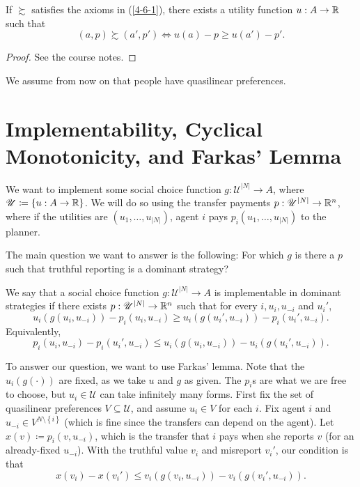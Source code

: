 \begin{proposition}
	If $\succsim$ satisfies the axioms in (\ref{4-6-1}), there exists a utility function $u: A \to \mathbb{R}$ such that \[
		(a,p) \succsim (a',p') \iff u(a) - p \ge u(a') - p'
	.\] 
\end{proposition}
\begin{proof}
	See the course notes.
\end{proof}

We assume from now on that people have quasilinear preferences.

\section{Implementability, Cyclical Monotonicity, and Farkas' Lemma}

We want to implement some social choice function $g: \mathscr{U}^{|N|} \to A$, where $\mathscr{U} \coloneqq \left\{u: A \to \mathbb{R}\right\}$. We will do so using the transfer payments $p: \mathscr{U}^{|N|} \to \mathbb{R}^n$, where if the utilities are $\left( u_1,\ldots,u_{\left| N \right|} \right)$, agent $i$ pays $p_i\left( u_1,\ldots,u_{\left|  N\right|} \right)$ to the planner.

The main question we want to answer is the following: For which $g$ is there a $p$ such that truthful reporting is a dominant strategy?

\begin{definition}[Implementability]
	We say that a social choice function $g: \mathscr{U}^{\left| N \right|} \to A$ is implementable in dominant strategies if there exists $p: \mathscr{U}^{\left| N \right|} \to \mathbb{R}^n$ such that for every $i, u_i, u_{-i}$ and $u_i'$, \[
		u_i\left( g\left( u_i,u_{-i} \right) \right) - p_i\left( u_i, u_{-i} \right) \ge 
		u_i\left( g\left( u_i',u_{-i} \right) \right) - p_i\left( u_i', u_{-i} \right)
	.\] 
	Equivalently, \[
		p_i\left( u_i, u_{-i} \right) - p_i\left( u_i', u_{-i} \right) \le u_i\left( g\left( u_i,u_{-i} \right) \right) - u_i\left( g\left( u_i',u_{-i} \right) \right)
	.\] 
\end{definition}

To answer our question, we want to use Farkas' lemma. Note that the $u_i(g(\cdot))$ are fixed, as we take $u$ and $g$ as given. The $p_i$s are what we are free to choose, but $u_i \in \mathscr{U}$ can take infinitely many forms.
First fix the set of quasilinear preferences $V \subseteq \mathscr{U}$, and assume $u_i \in V$ for each $i$. Fix agent $i$ and $u_{-i} \in V^{N \setminus \left\{i\right\}}$ (which is fine since the transfers can depend on the agent).
Let $x(v) \coloneqq p_i(v,u_{-i})$, which is the transfer that $i$ pays when she reports $v$ (for an already-fixed $u_{-i}$). With the truthful value $v_i$ and misreport $v_i'$,
our condition is that \[
	x(v_i) - x(v_i') \le v_i(g(v_i,u_{-i})) - v_i(g(v_i',u_{-i}))
.\] 

